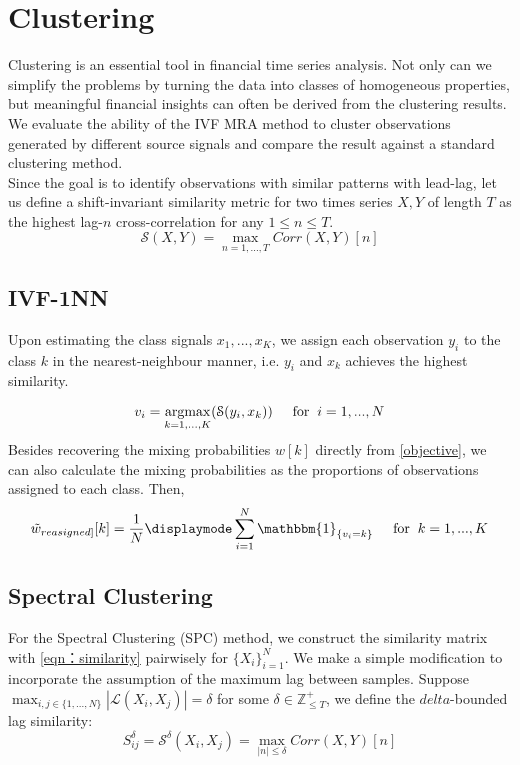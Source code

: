 \documentclass[sigconf]{acmart}
\DeclareMathOperator*{\argmax}{argmax}
\DeclareMathOperator*{\max}{max}
\begin{document}
\section{Clustering}
Clustering is an essential tool in financial time series analysis. Not only can we simplify the problems by turning the data into classes of homogeneous properties, but meaningful financial insights can often be derived from the clustering results. We evaluate the ability of the IVF MRA method to cluster observations generated by different source signals and compare the result against a standard clustering method. \\
Since the goal is to identify observations with similar patterns with lead-lag, let us define a shift-invariant similarity metric for two times series $X,Y$ of length $T$ as the highest lag-$n$ cross-correlation for any $1\leq n \leq T$.
\begin{equation}
\label{eqn：similarity}
    \mathcal{S}(X,Y) = \max_{n=1,...,T} Corr(X,Y)[n]
\end{equation}
\subsection{IVF-1NN}
\label{sec:IVF-1NN}
Upon estimating the class signals $x_1,...,x_K$, we assign each observation $y_i$ to the class $k$ in the nearest-neighbour manner, i.e. $y_i$ and $x_k$ achieves the highest similarity.

$$v_i = \argmax_{k=1,...,K}(\mathcal{S}(y_i,x_k))\hspace{.5cm} \text{for} \hspace{.2cm} i=1,...,N$$
Besides recovering the mixing probabilities $w[k]$ directly from \ref{objective}, we can also calculate the mixing probabilities as the proportions of observations assigned to each class.
Then,
$$\Tilde{w}_{reasigned]}[k] = \frac{1}{N}\displaymode \sum^N_{i=1} \mathbbm{1}_{\{v_i=k\}} \hspace{.5cm} \text{for} \hspace{.2cm} k=1,...,K$$
\subsection{Spectral Clustering}
\label{sec:SPC}
For the Spectral Clustering (SPC) method, we construct the similarity matrix with \ref{eqn：similarity} pairwisely for $\{X_i\}_{i=1}^N$. We make a simple modification to incorporate the assumption of the maximum lag between samples. Suppose $\max_{i,j \in \{1,...,N\}} |\mathcal{L}(X_i,X_j)| = \delta$ for some $\delta \in \mathbb{Z}^+_{\leq T}$, we define the $delta$-bounded lag similarity:
\begin{equation}
\label{eqn：similarity2}
S^\delta_{ij} = \mathcal{S^{\delta}}(X_i,X_j) = \max_{|n|\leq\delta} Corr(X,Y)[n]
\end{equation}
\end{document}
